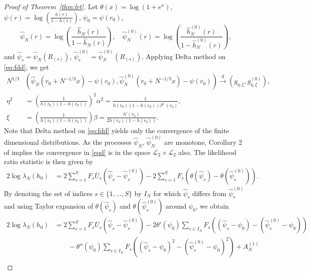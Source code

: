 \documentclass[12pt]{amsart}
\theoremstyle{plain}
\theoremstyle{remark}
\numberwithin{equation}{section}
\begin{document}
\begin{proof}[Proof of Theorem~\ref{thm:lrt}]
Let $\theta(x) = \log \left(1+e^x\right)$, $\psi(r) = \log \left(\frac{h(r)}{1-h(r)}\right)$, $\psi_0 = \psi(r_0)$,
\[\hat{\psi}_{N}(r) = \log\left(\frac{\hat{h}_N(r)}{1-\hat{h}_N(r)}\right),  \quad \hat{\psi}^{(0)}_{N}(r) = \log\left(\frac{\hat{h}^{(0)}_N(r)}{1-\hat{h}^{(0)}_N(r)}\right),\] and $\hat{\psi}_{s} = \hat{\psi}_{N}\left(R_{(s)}\right)$, $\hat{\psi}^{(0)}_{s} = \hat{\psi}_{N}^{(0)}\left(R_{(s)}\right)$. Applying Delta method on \eqref{eq:fdd}, 
we get
\begin{align}\label{eqd}
    N^{1/3}&\left(\hat{\psi}_N\left(r_0 + N^{-1/3}x\right) - \psi(r_0), \hat{\psi}^{(0)}_N\left(r_0 + N^{-1/3}x\right) - \psi(r_0)\right) \stackrel{\operatorname{d}}{\to} \left(g_{\eta,\xi}, g^{(0)}_{\eta,\xi}\right),\\
\eta^{2} &= \left(\frac{1}{h\left(r_{0}\right)\left(1-h\left(r_{0}\right)\right)}\right)^2\alpha^2 = \frac{1}{h\left(r_{0}\right)\left(1-h\left(r_{0}\right)\right)\mathcal{F}^\prime\left(r_{0}\right)}, \nonumber \\ \xi &= \left(\frac{1}{h\left(r_{0}\right)\left(1-h\left(r_{0}\right)\right)}\right)\beta = \frac{h'(r_0)}{2h\left(r_{0}\right)\left(1-h\left(r_{0}\right)\right)}. \nonumber\end{align} 
Note that Delta method on \eqref{eq:fdd} yields only the convergence of the finite dimensional distributions. As the processes $\hat{\psi}_N$, $ \hat{\psi}^{(0)}_N$ are monotone, Corollary 2 of \cite{MR1311975} implies
the convergence in \eqref{eqd} is 
in the space $\mathcal{L}_2 \times \mathcal{L}_2$ also. The likelihood ratio statistic is then given by
$$
\begin{aligned}
2 \log \lambda_{N}(h_0) 
& =2 \sum_{s=1}^{S} {F}_{s} \overline{U}_{s}\left(\hat{\psi}_{s}-\hat{\psi}^{(0)}_{s}\right)-2 \sum_{s=1}^{S} {F}_{s}\left(\theta\left(\hat{\psi}_{s}\right)-\theta\left(\hat{\psi}_{s}^{(0)}\right)\right).
\end{aligned}
$$
By denoting the set of indices $s \in \{1, \ldots, S\}$ by $I_N$ for which $\hat{\psi}_{s}$ differs from $\hat{\psi}_{s}^{(0)}$ and using Taylor expansion of $\theta\left(\hat{\psi}_{s}\right)$ and $\theta\left(\hat{\psi}_{s}^{(0)}\right)$ around $\psi_0
$, we obtain
\begin{align}\label{eq:ll1}
2 \log \lambda_{N}(h_0) &= 2 \sum_{s=1}^{S} {F}_{s} \overline{U}_{s}\left(\hat{\psi}_{s}-\hat{\psi}^{(0)}_{s}\right) - 2 \theta'\left(\psi_0\right)\sum_{s \in I_N} {F}_s\left(\left(\hat{\psi}_{s}-\psi_0\right)-\left(\hat{\psi}_{s}^{(0)}-\psi_0\right)\right) \nonumber\\ &\qquad -\theta''\left(\psi_0\right)\sum_{s \in I_N} {F}_s\left(\left(\hat{\psi}_{s}-\psi_0\right)^2-\left(\hat{\psi}_{s}^{(0)}-\psi_0\right)^2\right) +  A^{(1)}_N\nonumber\\

\end{align}
\end{proof}
\end{document}
